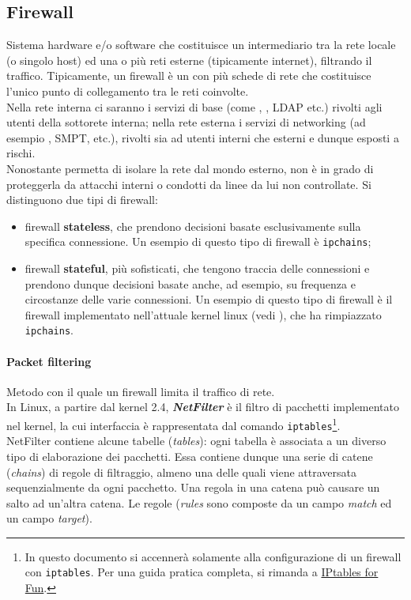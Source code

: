 \documentclass[a4paper,11pt]{article}
\def\code#1{\texttt{#1}}
\def\sub#1{\subsection{#1}\label{#1}}
\def\para#1{\paragraph{#1}\label{#1}}
\def\vedi#1{\nameref{#1}}
\begin{document}
\sub{Firewall} Sistema hardware e/o software che costituisce un intermediario tra la rete locale (o singolo host) ed una o più reti esterne (tipicamente internet), filtrando il traffico. Tipicamente, un firewall è un \vedi{DTE} con più schede di rete che costituisce l'unico punto di collegamento tra le reti coinvolte.\\
Nella rete interna ci saranno i servizi di base (come \vedi{NFS}, \vedi{NIS}, LDAP etc.) rivolti agli utenti della sottorete interna; nella rete esterna i servizi di networking (ad esempio \vedi{DNS}, SMPT, \vedi{FTP} etc.), rivolti sia ad utenti interni che esterni e dunque esposti a rischi.\\
Nonostante permetta di isolare la rete dal mondo esterno, non è in grado di proteggerla da attacchi interni o condotti da linee da lui non controllate.
Si distinguono due tipi di firewall:
\begin{itemize}
\item firewall \textbf{stateless}, che prendono decisioni basate esclusivamente sulla specifica connessione. Un esempio di questo tipo di firewall è \code{ipchains};
\item firewall \textbf{stateful}, più sofisticati, che tengono traccia delle connessioni e prendono dunque decisioni basate anche, ad esempio, su frequenza e circostanze delle varie connessioni. Un esempio di questo tipo di firewall è il firewall implementato nell'attuale kernel linux (vedi \vedi{Packet filtering}), che ha rimpiazzato \code{ipchains}.
\end{itemize}
\para{Packet filtering} Metodo con il quale un firewall limita il traffico di rete.\\
In Linux, a partire dal kernel 2.4, \textit{\textbf{NetFilter}} è il filtro di pacchetti  implementato nel kernel, la cui interfaccia è rappresentata dal comando \code{iptables}\footnote{In questo documento si accennerà solamente alla configurazione di un firewall con \code{iptables}. Per una guida pratica completa, si rimanda a \href{<www.commedia.it/ccontavalli/docs-it/iptables/iptables4dummies.pdf
>}{IPtables for Fun}.}.\\
NetFilter contiene alcune tabelle (\textit{tables}): ogni tabella è associata a un diverso tipo di elaborazione dei pacchetti. Essa contiene dunque una serie di catene (\textit{chains}) di regole di filtraggio, almeno una delle quali viene attraversata sequenzialmente da ogni pacchetto. Una regola in una catena può causare un salto ad un'altra catena. Le regole (\textit{rules} sono composte da un campo \textit{match} ed un campo \textit{target}).
\end{document}
